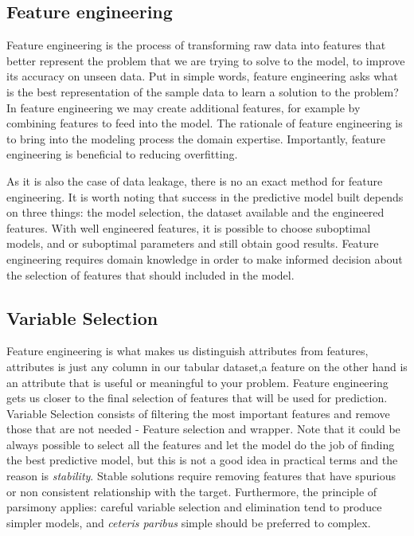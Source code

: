 \documentclass[11pt]{article}
\begin{document}
\subsection{Feature engineering}
\label{sse:fe}
Feature engineering is the process of transforming raw data into features that better represent the problem that we are trying to solve to the model, to improve its accuracy on unseen data. 
Put in simple words, feature engineering asks what is the best representation of the sample data to learn a solution to the problem?
In feature engineering we may create additional features, for example by combining features to feed into the model. The rationale of feature engineering is to bring into the modeling process the domain expertise. Importantly, feature engineering is beneficial to reducing overfitting. 

As it is also the case of data leakage, there is no an exact method for feature engineering. It is worth noting that success in the predictive model built depends on three things: the model selection, the dataset available and the engineered features. With well engineered features, it is possible to choose suboptimal models, and or suboptimal parameters and still obtain good results. Feature engineering requires domain knowledge in order to make informed decision about the selection of features that should included in the model.


\subsection{Variable Selection}
\label{sse:vs}
Feature engineering is what makes us distinguish attributes from features, attributes is just any column in our tabular dataset,a feature on the other hand is an attribute that is useful or meaningful to your problem. Feature engineering gets us closer to the final selection of features that will be used for prediction. 
Variable Selection consists of filtering the most important features and remove those that are not needed - Feature selection and wrapper.
Note that it could be always possible to select all the features and let the model do the job of finding the best predictive model, but this is not a good idea in practical terms and the reason is \emph{stability}. Stable solutions require removing features that have spurious or non consistent relationship with the target. Furthermore, the principle of parsimony applies: careful variable selection and elimination tend to produce simpler models, and \emph{ceteris paribus} simple should be preferred to complex.
\end{document}

